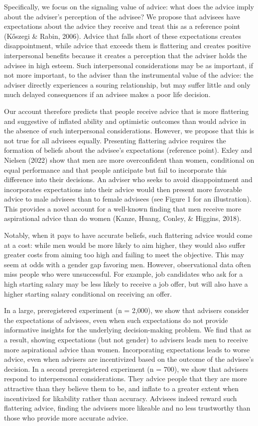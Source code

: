 \documentclass[
  man,floatsintext]{apa6}
\begin{document}
Specifically, we focus on the signaling value of advice: what does the advice imply about the adviser's perception of the advisee? We propose that advisees have expectations about the advice they receive and treat this as a reference point (Kőszegi \& Rabin, 2006). Advice that falls short of these expectations creates disappointment, while advice that exceeds them is flattering and creates positive interpersonal benefits because it creates a perception that the adviser holds the advisee in high esteem. Such interpersonal considerations may be as important, if not more important, to the adviser than the instrumental value of the advice: the adviser directly experiences a souring relationship, but may suffer little and only much delayed consequences if an advisee makes a poor life decision.

Our account therefore predicts that people receive advice that is more flattering and suggestive of inflated ability and optimistic outcomes than would advice in the absence of such interpersonal considerations. However, we propose that this is not true for all advisees equally. Presenting flattering advice requires the formation of beliefs about the advisee's expectations (reference point). Exley and Nielsen (2022) show that men are more overconfident than women, conditional on equal performance and that people anticipate but fail to incorporate this difference into their decisions. An adviser who seeks to avoid disappointment and incorporates expectations into their advice would then present more favorable advice to male advisees than to female advisees (see Figure 1 for an illustration). This provides a novel account for a well-known finding that men receive more aspirational advice than do women (Kanze, Huang, Conley, \& Higgins, 2018).

Notably, when it pays to have accurate beliefs, such flattering advice would come at a cost: while men would be more likely to aim higher, they would also suffer greater costs from aiming too high and failing to meet the objective. This may seem at odds with a gender gap favoring men. However, observational data often miss people who were unsuccessful. For example, job candidates who ask for a high starting salary may be less likely to receive a job offer, but will also have a higher starting salary conditional on receiving an offer.

In a large, preregistered experiment (n = 2,000), we show that advisers consider the expectations of advisees, even when such expectations do not provide informative insights for the underlying decision-making problem. We find that as a result, showing expectations (but not gender) to advisers leads men to receive more aspirational advice than women. Incorporating expectations leads to worse advice, even when advisers are incentivized based on the outcome of the advisee's decision. In a second preregistered experiment (n = 700), we show that advisers respond to interpersonal considerations. They advice people that they are more attractive than they believe them to be, and inflate to a greater extent when incentivized for likability rather than accuracy. Advisees indeed reward such flattering advice, finding the advisers more likeable and no less trustworthy than those who provide more accurate advice.
\end{document}

